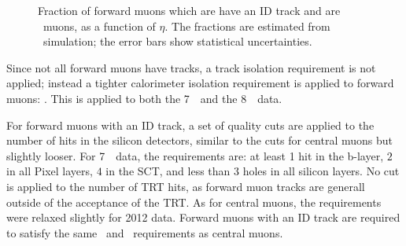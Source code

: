 \begin{figure}[h]
\centering
\caption[Fraction of forward muons which are \combined\ muons as a function of
$\eta$]{Fraction of forward
muons which are have an ID track and are \combined\ muons, as a function of
$\eta$. The fractions are estimated from \mc\ simulation; the error bars show
statistical uncertainties.}
\label{fig:fwdmu-frac-combined}
\end{figure}

Since not all forward muons
have tracks, a track isolation requirement is not applied; instead a tighter calorimeter isolation
requirement is applied to forward muons: . This is applied
to both the 7~\tev\ and the 8~\tev\ data.

For forward muons with an ID track, a set of quality
cuts are applied to the number of hits in the silicon detectors, similar to the
cuts for central muons but slightly looser. For 7~\tev\ data,
the requirements are: at least 1 hit in the b-layer, $2$ in all Pixel layers,
$4$ in the SCT, and less than 3 holes 
in all silicon layers. No cut is applied to the number of TRT hits, as forward
muon tracks are generall outside of the acceptance of the TRT. As for
central muons, the requirements were relaxed slightly for 2012 data.
Forward muons with an ID track are required to satisfy the same
\zzero\ and \dzerosig\ requirements as central muons.

